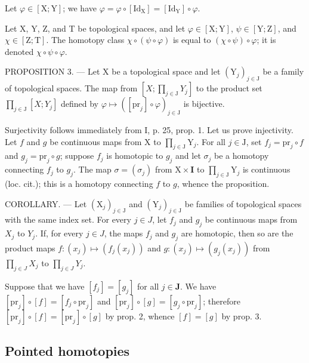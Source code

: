 Let \(\varphi\in[\mathrm{X};\mathrm{Y}]\); we have \(\varphi=\varphi\circ[\mathrm{Id}_{\mathrm{X}}]=[\mathrm{Id}_{\mathrm{Y}}]\circ\varphi\).

Let X, Y, Z, and T be topological spaces, and let \(\varphi \in [\mathrm{X};\mathrm{Y}]\), \(\psi \in [\mathrm{Y};\mathrm{Z}]\), and \(\chi \in [\mathrm{Z};\mathrm{T}]\). The homotopy class \(\chi \circ (\psi \circ \varphi)\) is equal to \((\chi \circ \psi) \circ \varphi\); it is denoted \(\chi \circ \psi \circ \varphi\).

PROPOSITION 3. --- Let X be a topological space and let \((\mathrm{Y}_{j})_{j\in\mathrm{J}}\) be a family of topological spaces. The map from \([X;\prod_{j\in\mathrm{J}}Y_{j}]\) to the product set \(\prod_{j\in\mathrm{J}}[X;Y_{j}]\) defined by \(\varphi\mapsto([\mathrm{pr}_{j}]\circ\varphi)_{j\in\mathrm{J}}\) is bijective.

Surjectivity follows immediately from I, p. 25, prop. 1. Let us prove injectivity. Let \(f\) and \(g\) be continuous maps from X to \(\prod_{j \in \mathrm{J}} \mathrm{Y}_j\). For all \(j \in \mathrm{J}\), set \(f_j = \mathrm{pr}_j \circ f\) and \(g_j = \mathrm{pr}_j \circ g\); suppose \(f_j\) is homotopic to \(g_j\) and let \(\sigma_j\) be a homotopy connecting \(f_j\) to \(g_j\). The map \(\sigma = (\sigma_j)\) from \(\mathrm{X} \times \mathbf{I}\) to \(\prod_{j \in \mathrm{J}} \mathrm{Y}_j\) is continuous (loc. cit.); this is a homotopy connecting \(f\) to \(g\), whence the proposition.

COROLLARY. --- Let \((\mathrm{X}_{j})_{j\in\mathrm{J}}\) and \((\mathrm{Y}_{j})_{j\in\mathrm{J}}\) be families of topological spaces with the same index set. For every \(j\in J\), let \(f_{j}\) and \(g_{j}\) be continuous maps from \(X_{j}\) to \(Y_{j}\). If, for every \(j\in J\), the maps \(f_{j}\) and \(g_{j}\) are homotopic, then so are the product maps \(f\colon(x_{j})\mapsto(f_{j}(x_{j}))\) and \(g\colon(x_{j})\mapsto(g_{j}(x_{j}))\) from \(\prod_{j\in J}X_{j}\) to \(\prod_{j\in J}Y_{j}\).

Suppose that we have \([f_j] = [g_j]\) for all \(j \in \mathbf{J}\). We have \([\mathrm{pr}_j] \circ [f] = [f_j \circ \mathrm{pr}_j]\) and \([\mathrm{pr}_j] \circ [g] = [g_j \circ \mathrm{pr}_j]\); therefore \([\mathrm{pr}_j] \circ [f] = [\mathrm{pr}_j] \circ [g]\) by prop. 2, whence \([f] = [g]\) by prop. 3.

\subsection{Pointed homotopies}

